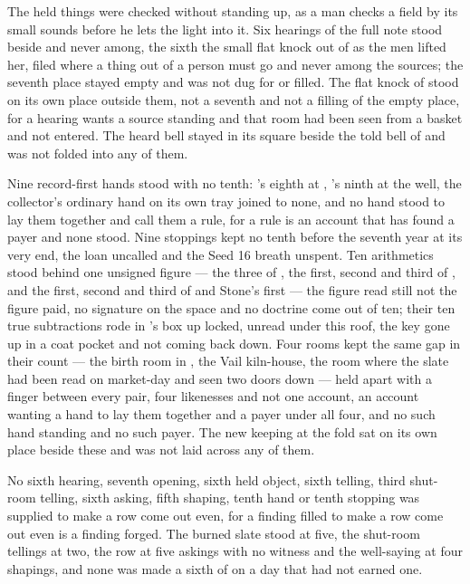 The held things were checked without standing up, as a man checks a field by its small sounds before he lets the light into it. Six hearings of the full note stood beside and never among, the sixth the small flat knock out of  as the men lifted her, filed where a thing out of a person must go and never among the sources; the seventh place stayed empty and was not dug for or filled. The flat knock of  stood on its own place outside them, not a seventh and not a filling of the empty place, for a hearing wants a source standing and that room had been seen from a basket and not entered. The heard bell stayed in its square beside the told bell of  and was not folded into any of them.

Nine record-first hands stood with no tenth: 's eighth at , 's ninth at the well, the collector's ordinary hand on its own tray joined to none, and no hand stood to lay them together and call them a rule, for a rule is an account that has found a payer and none stood. Nine stoppings kept no tenth before the seventh year at its very end, the loan uncalled and the Seed 16 breath unspent. Ten arithmetics stood behind one unsigned figure — the three of , the first, second and third of , and the first, second and third of  and Stone's first — the figure read still not the figure paid, no signature on the space and no doctrine come out of ten; their ten true subtractions rode in 's box up  locked, unread under this roof, the key gone up in a coat pocket and not coming back down. Four rooms kept the same gap in their count — the birth room in , the Vail kiln-house, the room where the slate had been read on market-day and  seen two doors down — held apart with a finger between every pair, four likenesses and not one account, an account wanting a hand to lay them together and a payer under all four, and no such hand standing and no such payer. The new keeping at the fold sat on its own place beside these and was not laid across any of them.

No sixth hearing, seventh opening, sixth held object, sixth telling, third shut-room telling, sixth asking, fifth shaping, tenth hand or tenth stopping was supplied to make a row come out even, for a finding filled to make a row come out even is a finding forged. The burned slate stood at five, the shut-room tellings at two, the row at five askings with no witness and the well-saying at four shapings, and none was made a sixth of on a day that had not earned one.

